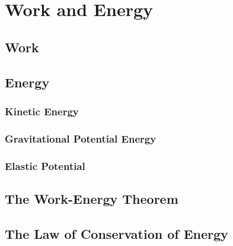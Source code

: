 \chapter{Work and Energy}
	\section{Work}
	\section{Energy}
	\subsection{Kinetic Energy}
	\subsection{Gravitational Potential Energy}
	\subsection{Elastic Potential}
	\section{The Work-Energy Theorem}
	\section{The Law of Conservation of Energy}
	

		


	


